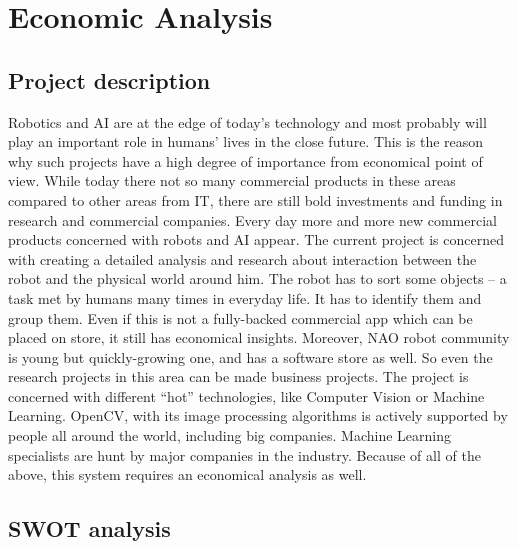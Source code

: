 \section{Economic Analysis}

	\subsection{Project description}

	Robotics and AI are at the edge of today's technology and most probably will play an important role in humans' lives in the close future. This is the reason why such projects have a high degree of importance from economical point of view. While today there not so many commercial products in these areas compared to other areas from IT, there are still bold investments and funding in research and commercial companies. Every day more and more new commercial products concerned with robots and AI appear. 
  	The current project is concerned with creating a detailed analysis and research about interaction between the robot and the physical world around him. The robot has to sort some objects -- a task met by humans many times in everyday life. It has to identify them and group them. Even if this is not a fully-backed commercial app which can be placed on store, it still has economical insights. Moreover, NAO robot community is young but quickly-growing one, and has a software store as well. So even the research projects in this area can be made business projects. The project is concerned with different ``hot'' technologies, like Computer Vision or Machine Learning. OpenCV, with its image processing algorithms is actively supported by people all around the world, including big companies. Machine Learning specialists are hunt by major companies in the industry. Because of all of the above, this system requires an economical analysis as well.

	\subsection{SWOT analysis}

